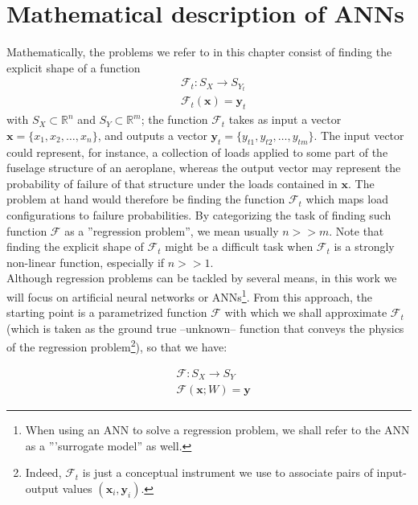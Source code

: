 \section{Mathematical description of ANNs}\label{sec:ANNs}
\indent Mathematically, the problems we refer to in this chapter consist of finding the explicit shape of a function
\begin{align}\label{eq:F}
	& \mathcal{F}_{t}:S_X\rightarrow S_{Y_{t}} \\
	& \mathcal{F}_t(\mathbf{x})=\mathbf{y}_t
\end{align}
with $S_X\subset\mathbb{R}^n$ and $S_Y\subset\mathbb{R}^m$; \ie the function $\mathcal{F}_t$ takes as input a vector $\mathbf{x}=\{x_1,x_2,\ldots,x_n\}$, and outputs a vector $\mathbf{y}_t=\{y_{t1},y_{t2},\ldots,y_{tm}\}$. The input vector could represent, for instance, a collection of loads applied to some part of the fuselage structure of an aeroplane, whereas the output vector may represent the probability of failure of that structure under the loads contained in $\mathbf{x}$. The problem at hand would therefore be finding the function $\mathcal{F}_t$ which maps load configurations to failure probabilities. By categorizing the task of finding such function $\mathcal{F}$ as a ''regression problem'', we mean usually $n>>m$. Note that finding the explicit shape of $\mathcal{F}_t$ might be a difficult task when $\mathcal{F}_t$ is a strongly non-linear function, especially if $n>>1$.\\
%
\indent Although regression problems can be tackled by several means, in this work we will focus on artificial neural networks or ANNs\cite{Marsland2015Machine}\footnote{When using an ANN to solve a regression problem, we shall refer to the ANN as a '''surrogate model'' as well.}. From this approach, the starting point is a parametrized function $\mathcal{F}$ with which we shall approximate $\mathcal{F}_t$ (which is taken as the ground true --unknown-- function that conveys the physics of the regression problem\footnote{Indeed, $\mathcal{F}_t$ is just a conceptual instrument we use to associate pairs of input-output values $(\mathbf{x}_i,\mathbf{y}_i)$.}), so that we have:

\begin{align}
	& {\mathcal{F}} : S_X \rightarrow S_Y \\
	& {\mathcal{F}}(\mathbf{x}; W) = \mathbf{{y}} \label{eq:Fhat}
\end{align}

